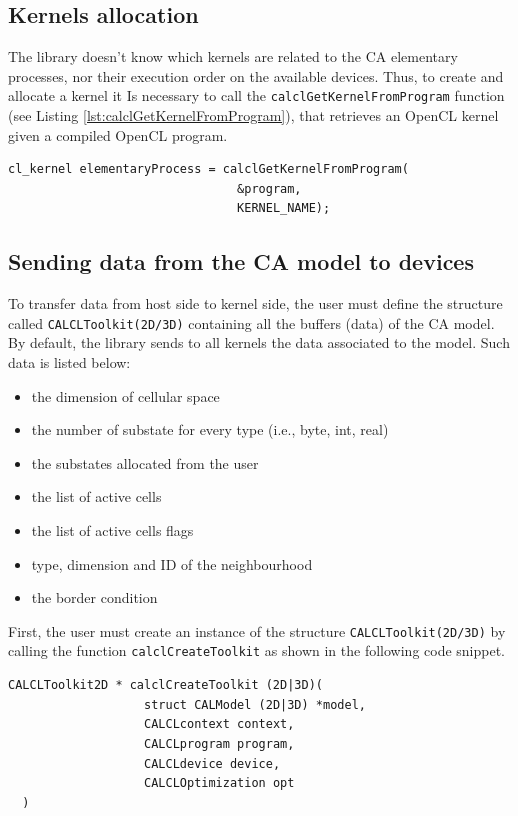 \subsection{Kernels allocation}

The library doesn't know which kernels are related to the CA
elementary processes, nor their execution order on the available
devices. Thus, to create and allocate a kernel it Is necessary to call
the \verb'calclGetKernelFromProgram' function (see Listing
\ref{lst:calclGetKernelFromProgram}), that retrieves an OpenCL kernel
given a compiled OpenCL program.

\begin{lstlisting}[float,floatplacement=H, label=lst:calclGetKernelFromProgram, caption=The calclGetKernelFromProgram function., numbers=none]
  cl_kernel elementaryProcess = calclGetKernelFromProgram(
                                &program,
                                KERNEL_NAME);
\end{lstlisting}

\subsection{Sending data from the CA model to devices}

To transfer data from host side to kernel side, the user must define
the structure called \verb'CALCLToolkit(2D/3D)' containing all the
buffers (data) of the CA model. By default, the library sends to all
kernels the data associated to the model. Such data is listed
below:

\begin{itemize}
	\item the dimension of cellular space
	\item the number of substate for every type (i.e., byte, int, real)
	\item the substates allocated from the user
	\item the list of active cells
	\item the list of active cells flags
	\item type, dimension and ID of the neighbourhood
	\item the border condition
\end{itemize}

First, the user must create an instance of the structure
\verb'CALCLToolkit(2D/3D)' by calling the function
\verb'calclCreateToolkit' as shown in the following code snippet.

\begin{lstlisting}[numbers=none]
  CALCLToolkit2D * calclCreateToolkit (2D|3D)(
                   struct CALModel (2D|3D) *model,
                   CALCLcontext context,
                   CALCLprogram program,
                   CALCLdevice device,
                   CALCLOptimization opt
  )
\end{lstlisting}

